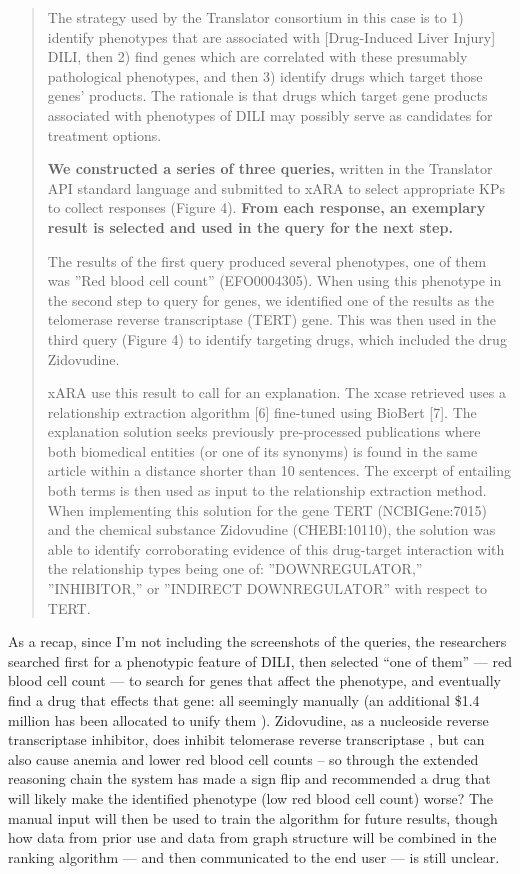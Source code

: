 \documentclass[10pt]{article}
\begin{document}
\begin{multicols}{2}
\begin{quote}
The strategy used by the Translator consortium in this case is to 1)
identify phenotypes that are associated with {[}Drug-Induced Liver
Injury{]} DILI, then 2) find genes which are correlated with these
presumably pathological phenotypes, and then 3) identify drugs which
target those genes' products. The rationale is that drugs which target
gene products associated with phenotypes of DILI may possibly serve as
candidates for treatment options.

\textbf{We constructed a series of three queries,} written in the
Translator API standard language and submitted to xARA to select
appropriate KPs to collect responses (Figure 4). \textbf{From each
response, an exemplary result is selected and used in the query for the
next step.}

The results of the first query produced several phenotypes, one of them
was ''Red blood cell count'' (EFO0004305). When using this phenotype in
the second step to query for genes, we identified one of the results as
the telomerase reverse transcriptase (TERT) gene. This was then used in
the third query (Figure 4) to identify targeting drugs, which included
the drug Zidovudine.

xARA use this result to call for an explanation. The xcase retrieved
uses a relationship extraction algorithm {[}6{]} fine-tuned using
BioBert {[}7{]}. The explanation solution seeks previously pre-processed
publications where both biomedical entities (or one of its synonyms) is
found in the same article within a distance shorter than 10 sentences.
The excerpt of entailing both terms is then used as input to the
relationship extraction method. When implementing this solution for the
gene TERT (NCBIGene:7015) and the chemical substance Zidovudine
(CHEBI:10110), the solution was able to identify corroborating evidence
of this drug-target interaction with the relationship types being one
of: ''DOWNREGULATOR,'' ''INHIBITOR,'' or ''INDIRECT DOWNREGULATOR'' with
respect to TERT. \cite{goelExplanationContainerCaseBased2021} 
\end{quote}

As a recap, since I'm not including the screenshots of the queries, the
researchers searched first for a phenotypic feature of DILI, then
selected ``one of them'' --- red blood cell count --- to search for
genes that affect the phenotype, and eventually find a drug that effects
that gene: all seemingly manually (an additional \$1.4 million has been
allocated to unify them \cite{haendelCommonDialectInfrastructure2021} ). Zidovudine, as a nucleoside reverse transcriptase inhibitor, does
inhibit telomerase reverse transcriptase \cite{hukezalieVitroExVivo2012} , but can also cause anemia and lower red
blood cell counts \cite{ZidovudinePatientNIH}  -- so through the
extended reasoning chain the system has made a sign flip and recommended
a drug that will likely make the identified phenotype (low red blood
cell count) worse? The manual input will then be used to train the
algorithm for future results, though how data from prior use and data
from graph structure will be combined in the ranking algorithm --- and
then communicated to the end user --- is still unclear.


\end{multicols}
\end{document}
